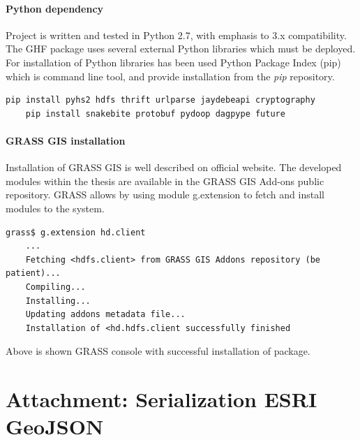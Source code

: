 \documentclass[a4paper,12pt,oneside]{report}
\begin{document}
		\paragraph{Python dependency}
		Project is written and tested in Python 2.7, with emphasis to 3.x
compatibility.
		The GHF package uses several external Python libraries which must be deployed.
For
		installation of Python libraries has been used Python Package Index (pip)
which
		is command line tool, and provide installation from the \textit{pip}
repository.
		\begin{footnotesize}
			\begin{lstlisting}[style=python]
	pip install pyhs2 hdfs thrift urlparse jaydebeapi cryptography
	pip install snakebite protobuf pydoop dagpype future
			\end{lstlisting}
		\end{footnotesize}
		
		
		\paragraph{GRASS GIS installation}
		Installation of GRASS GIS is well described on official website. The developed
		modules within the thesis are available in the GRASS GIS Add-ons public
repository.
		GRASS allows by using module g.extension to fetch and install modules to the
system.
		\begin{footnotesize}
			\begin{lstlisting}[style=python]
	grass$ g.extension hd.client
	...
	Fetching <hdfs.client> from GRASS GIS Addons repository (be patient)...
	Compiling...
	Installing...
	Updating addons metadata file...
	Installation of <hd.hdfs.client successfully finished
			\end{lstlisting}
		\end{footnotesize}
		Above is shown GRASS console with successful installation of package. 


\newpage
\section{Attachment: Serialization ESRI GeoJSON}\label{serde}
\end{document}

